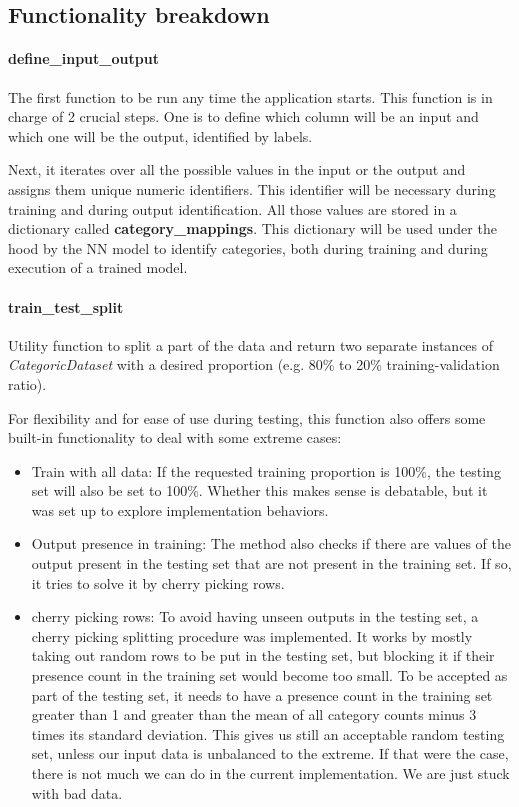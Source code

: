 \documentclass[a4paper, 11pt]{report}
\begin{document}
   \subsection{Functionality breakdown}\label{Section: Methodology_dataset}
   \paragraph{define\_input\_output}
   The first function to be run any time the application starts. This function is in charge of 2 crucial steps. One is to define which column will be an input and which one will be the output, identified by labels.

   Next, it iterates over all the possible values in the input or the output and assigns them unique numeric identifiers. This identifier will be necessary during training and during output identification. All those values are stored in a dictionary called \textbf{category\_mappings}. This dictionary will be used under the hood by the NN model to identify categories, both during training and during execution of a trained model.

   \paragraph{train\_test\_split} Utility function to split a part of the data and return two separate instances of \textit{CategoricDataset} with a desired proportion (e.g. 80\% to 20\% training-validation ratio).

   For flexibility and for ease of use during testing, this function also offers some built-in functionality to deal with some extreme cases:

   \begin{itemize}
        \item Train with all data: If the requested training proportion is 100\%, the testing set will also be set to 100\%. Whether this makes sense is debatable, but it was set up to explore implementation behaviors.
        \item Output presence in training: The method also checks if there are values of the output present in the testing set that are not present in the training set. If so, it tries to solve it by cherry picking rows.

        \item cherry picking rows: To avoid having unseen outputs in the testing set, a cherry picking splitting procedure was implemented. It works by mostly taking out random rows to be put in the testing set, but blocking it if their presence count in the training set would become too small. To be accepted as part of the testing set, it needs to have a presence count in the training set greater than 1 and greater than the mean of all category counts minus 3 times its standard deviation. This gives us still an acceptable random testing set, unless our input data is unbalanced to the extreme. If that were the case, there is not much we can do in the current implementation. We are just stuck with bad data.
    \end{itemize}
\end{document}
